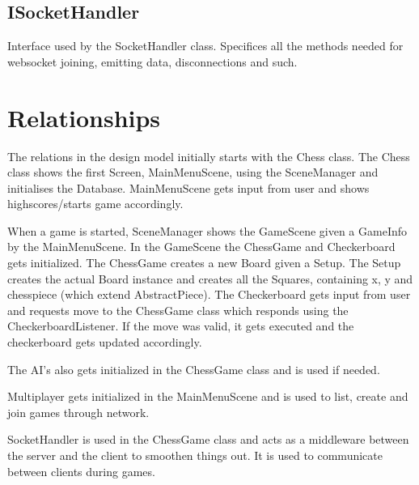 \documentclass{article}
\begin{document}
\subsection {ISocketHandler}
Interface used by the SocketHandler class. Specifices all the methods needed for websocket joining, emitting data, disconnections and such.

\section*{Relationships}
The relations in the design model initially starts with the Chess class. The Chess class shows the first Screen, MainMenuScene, using the SceneManager and initialises the Database. MainMenuScene gets input from user and shows highscores/starts game accordingly.

When a game is started, SceneManager shows the GameScene given a GameInfo by the MainMenuScene. In the GameScene the ChessGame and Checkerboard gets initialized. The ChessGame creates a new Board given a Setup. The Setup creates the actual Board instance and creates all the Squares, containing x, y and chesspiece (which extend AbstractPiece). The Checkerboard gets input from user and requests move to the ChessGame class which responds using the CheckerboardListener. If the move was valid, it gets executed and the checkerboard gets updated accordingly.

The AI’s also gets initialized in the ChessGame class and is used if needed.

Multiplayer gets initialized in the MainMenuScene and is used to list, create and join games through network.

SocketHandler is used in the ChessGame class and acts as a middleware between the server and the client to smoothen things out. It is used to communicate between clients during games.
\end{document}

